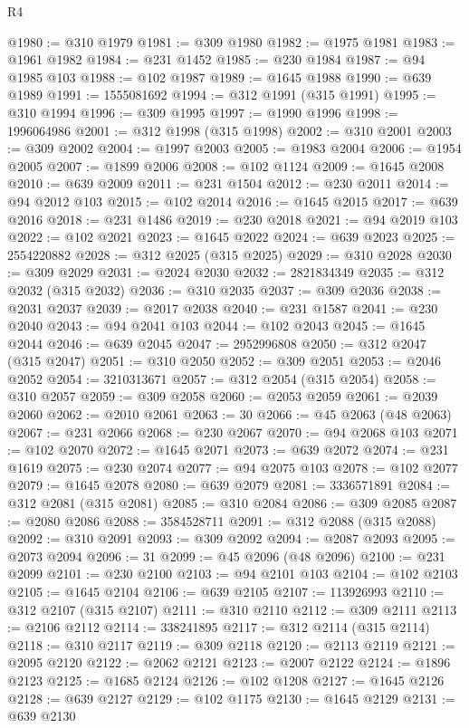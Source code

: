 \begin{lexlean}{R4}
\begin{coremodule}
@1980 := @310 @1979
@1981 := @309 @1980
@1982 := @1975 @1981
@1983 := @1961 @1982
@1984 := @231 @1452
@1985 := @230 @1984
@1987 := @94 @1985 @103
@1988 := @102 @1987
@1989 := @1645 @1988
@1990 := @639 @1989
@1991 := 1555081692
@1994 := @312 @1991 (@315 @1991)
@1995 := @310 @1994
@1996 := @309 @1995
@1997 := @1990 @1996
@1998 := 1996064986
@2001 := @312 @1998 (@315 @1998)
@2002 := @310 @2001
@2003 := @309 @2002
@2004 := @1997 @2003
@2005 := @1983 @2004
@2006 := @1954 @2005
@2007 := @1899 @2006
@2008 := @102 @1124
@2009 := @1645 @2008
@2010 := @639 @2009
@2011 := @231 @1504
@2012 := @230 @2011
@2014 := @94 @2012 @103
@2015 := @102 @2014
@2016 := @1645 @2015
@2017 := @639 @2016
@2018 := @231 @1486
@2019 := @230 @2018
@2021 := @94 @2019 @103
@2022 := @102 @2021
@2023 := @1645 @2022
@2024 := @639 @2023
@2025 := 2554220882
@2028 := @312 @2025 (@315 @2025)
@2029 := @310 @2028
@2030 := @309 @2029
@2031 := @2024 @2030
@2032 := 2821834349
@2035 := @312 @2032 (@315 @2032)
@2036 := @310 @2035
@2037 := @309 @2036
@2038 := @2031 @2037
@2039 := @2017 @2038
@2040 := @231 @1587
@2041 := @230 @2040
@2043 := @94 @2041 @103
@2044 := @102 @2043
@2045 := @1645 @2044
@2046 := @639 @2045
@2047 := 2952996808
@2050 := @312 @2047 (@315 @2047)
@2051 := @310 @2050
@2052 := @309 @2051
@2053 := @2046 @2052
@2054 := 3210313671
@2057 := @312 @2054 (@315 @2054)
@2058 := @310 @2057
@2059 := @309 @2058
@2060 := @2053 @2059
@2061 := @2039 @2060
@2062 := @2010 @2061
@2063 := 30
@2066 := @45 @2063 (@48 @2063)
@2067 := @231 @2066
@2068 := @230 @2067
@2070 := @94 @2068 @103
@2071 := @102 @2070
@2072 := @1645 @2071
@2073 := @639 @2072
@2074 := @231 @1619
@2075 := @230 @2074
@2077 := @94 @2075 @103
@2078 := @102 @2077
@2079 := @1645 @2078
@2080 := @639 @2079
@2081 := 3336571891
@2084 := @312 @2081 (@315 @2081)
@2085 := @310 @2084
@2086 := @309 @2085
@2087 := @2080 @2086
@2088 := 3584528711
@2091 := @312 @2088 (@315 @2088)
@2092 := @310 @2091
@2093 := @309 @2092
@2094 := @2087 @2093
@2095 := @2073 @2094
@2096 := 31
@2099 := @45 @2096 (@48 @2096)
@2100 := @231 @2099
@2101 := @230 @2100
@2103 := @94 @2101 @103
@2104 := @102 @2103
@2105 := @1645 @2104
@2106 := @639 @2105
@2107 := 113926993
@2110 := @312 @2107 (@315 @2107)
@2111 := @310 @2110
@2112 := @309 @2111
@2113 := @2106 @2112
@2114 := 338241895
@2117 := @312 @2114 (@315 @2114)
@2118 := @310 @2117
@2119 := @309 @2118
@2120 := @2113 @2119
@2121 := @2095 @2120
@2122 := @2062 @2121
@2123 := @2007 @2122
@2124 := @1896 @2123
@2125 := @1685 @2124
@2126 := @102 @1208
@2127 := @1645 @2126
@2128 := @639 @2127
@2129 := @102 @1175
@2130 := @1645 @2129
@2131 := @639 @2130

\end{coremodule}
\end{lexlean}
